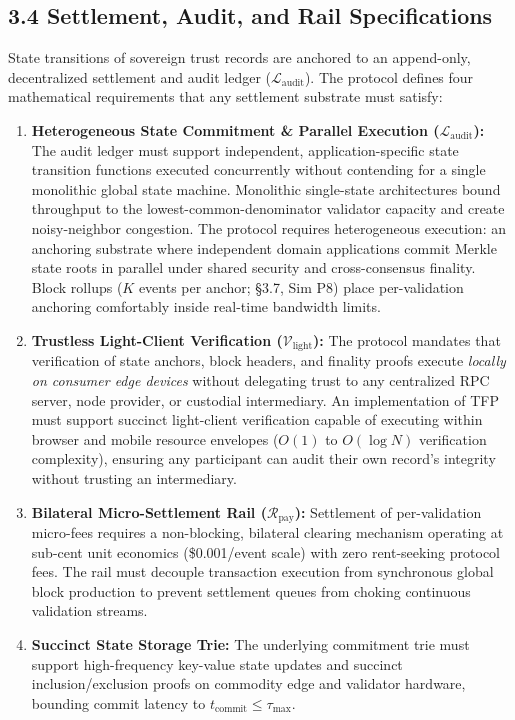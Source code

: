 \documentclass[
]{article}
\providecommand{\tightlist}{%
  \setlength{\itemsep}{0pt}\setlength{\parskip}{0pt}}
\begin{document}
\subsection{3.4 Settlement, Audit, and Rail
Specifications}\label{settlement-audit-and-rail-specifications}

State transitions of sovereign trust records are anchored to an
append-only, decentralized settlement and audit ledger
(\(\mathcal{L}_{\text{audit}}\)). The protocol defines four mathematical
requirements that any settlement substrate must satisfy:

\begin{enumerate}
\def\labelenumi{\arabic{enumi}.}
\tightlist
\item
  \textbf{Heterogeneous State Commitment \& Parallel Execution
  (\(\mathcal{L}_{\text{audit}}\)):} The audit ledger must support
  independent, application-specific state transition functions executed
  concurrently without contending for a single monolithic global state
  machine. Monolithic single-state architectures bound throughput to the
  lowest-common-denominator validator capacity and create noisy-neighbor
  congestion. The protocol requires heterogeneous execution: an
  anchoring substrate where independent domain applications commit
  Merkle state roots in parallel under shared security and
  cross-consensus finality. Block rollups (\(K\) events per anchor;
  §3.7, Sim P8) place per-validation anchoring comfortably inside
  real-time bandwidth limits.
\item
  \textbf{Trustless Light-Client Verification
  (\(\mathcal{V}_{\text{light}}\)):} The protocol mandates that
  verification of state anchors, block headers, and finality proofs
  execute \emph{locally on consumer edge devices} without delegating
  trust to any centralized RPC server, node provider, or custodial
  intermediary. An implementation of TFP must support succinct
  light-client verification capable of executing within browser and
  mobile resource envelopes (\(O(1)\) to \(O(\log N)\) verification
  complexity), ensuring any participant can audit their own record's
  integrity without trusting an intermediary.
\item
  \textbf{Bilateral Micro-Settlement Rail
  (\(\mathcal{R}_{\text{pay}}\)):} Settlement of per-validation
  micro-fees requires a non-blocking, bilateral clearing mechanism
  operating at sub-cent unit economics (\$0.001/event scale) with zero
  rent-seeking protocol fees. The rail must decouple transaction
  execution from synchronous global block production to prevent
  settlement queues from choking continuous validation streams.
\item
  \textbf{Succinct State Storage Trie:} The underlying commitment trie
  must support high-frequency key-value state updates and succinct
  inclusion/exclusion proofs on commodity edge and validator hardware,
  bounding commit latency to
  \(t_{\text{commit}} \le \tau_{\text{max}}\).
\end{enumerate}
\end{document}
